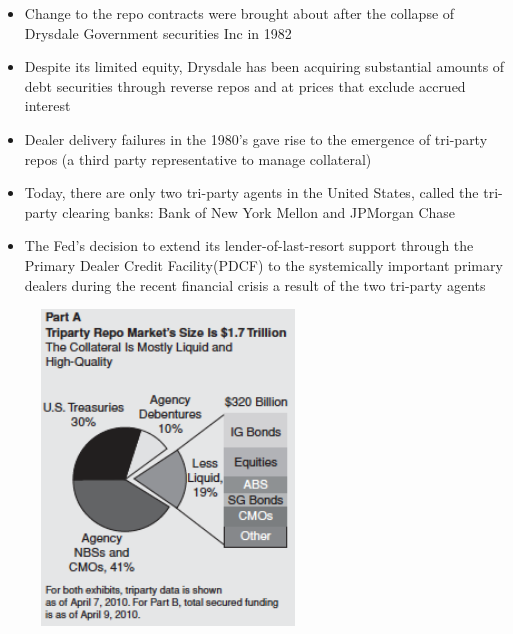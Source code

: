 \documentclass[11pt]{beamer}
\begin{document}
\begin{frame}
\begin{itemize}
\item Change to the repo contracts were brought about after the collapse of Drysdale Government securities Inc in 1982
\item Despite its limited equity, Drysdale has been acquiring substantial amounts of debt securities through reverse repos and at prices that exclude accrued interest
\item Dealer delivery failures in the 1980's gave rise to the emergence of tri-party repos (a third party representative to manage collateral)
\item Today, there are only two tri-party agents in the United States, called the tri-party clearing banks: Bank of New York Mellon and JPMorgan Chase
\item The Fed’s decision to extend its lender-of-last-resort support through the Primary Dealer Credit Facility(PDCF) to the systemically important primary dealers during the recent financial crisis a result of the two tri-party agents
\end{itemize}
\end{frame}

\begin{frame}
\begin{figure}
\includegraphics[width=0.6\textwidth]{11_2.png}
\end{figure}
\end{frame}
\end{document}
